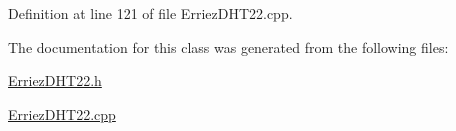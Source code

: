 Definition at line 121 of file Erriez\+D\+H\+T22.\+cpp.



The documentation for this class was generated from the following files\+:\begin{DoxyCompactItemize}
\item 
\hyperlink{_erriez_d_h_t22_8h}{Erriez\+D\+H\+T22.\+h}\item 
\hyperlink{_erriez_d_h_t22_8cpp}{Erriez\+D\+H\+T22.\+cpp}\end{DoxyCompactItemize}
